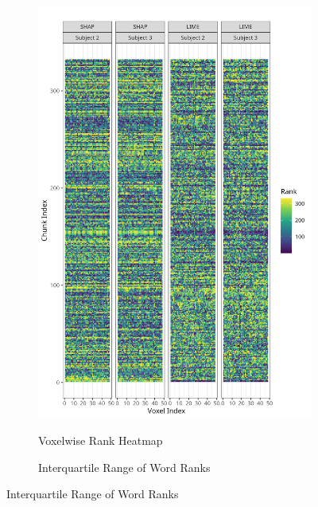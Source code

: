 \documentclass[10pt,letterpaper]{article}
\begin{document}
\begin{figure}[ht]
    \begin{subfigure}[t]{0.35\textwidth}
        \centering
        \caption{Voxelwise Rank Heatmap}
        \includegraphics[width=\textwidth]{figs/heatmap_buck.png}
        \label{subfig:heatmap_buck}
    \end{subfigure}
    \hfill
    \begin{subfigure}[t]{0.35\textwidth}
        \centering
        \caption{Interquartile Range of Word Ranks}

\end{subfigure}
\end{figure}
\end{document}
